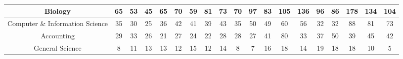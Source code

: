 \documentclass[10]{article}
\begin{document}
\begin{landscape}
\begin{longtable}[c]{|ccccccccccccccccccc|}
	\multicolumn{1}{|c|}{Biology}                                    & \multicolumn{1}{c|}{65}         & \multicolumn{1}{c|}{53}         & \multicolumn{1}{c|}{45}         & \multicolumn{1}{c|}{65}         & \multicolumn{1}{c|}{70}         & \multicolumn{1}{c|}{59}         & \multicolumn{1}{c|}{81}         & \multicolumn{1}{c|}{73}         & \multicolumn{1}{c|}{70}         & \multicolumn{1}{c|}{97}         & \multicolumn{1}{c|}{83}         & \multicolumn{1}{c|}{105}        & \multicolumn{1}{c|}{136}        & \multicolumn{1}{c|}{96}         & \multicolumn{1}{c|}{86}         & \multicolumn{1}{c|}{178}        & \multicolumn{1}{c|}{134}        & 104        \\ \hline
	\multicolumn{1}{|c|}{Computer \& Information Science}            & \multicolumn{1}{c|}{35}         & \multicolumn{1}{c|}{30}         & \multicolumn{1}{c|}{25}         & \multicolumn{1}{c|}{36}         & \multicolumn{1}{c|}{42}         & \multicolumn{1}{c|}{41}         & \multicolumn{1}{c|}{39}         & \multicolumn{1}{c|}{43}         & \multicolumn{1}{c|}{35}         & \multicolumn{1}{c|}{50}         & \multicolumn{1}{c|}{49}         & \multicolumn{1}{c|}{60}         & \multicolumn{1}{c|}{56}         & \multicolumn{1}{c|}{32}         & \multicolumn{1}{c|}{32}         & \multicolumn{1}{c|}{88}         & \multicolumn{1}{c|}{81}         & 73         \\ \hline
	\multicolumn{1}{|c|}{Accounting}                                 & \multicolumn{1}{c|}{29}         & \multicolumn{1}{c|}{33}         & \multicolumn{1}{c|}{26}         & \multicolumn{1}{c|}{21}         & \multicolumn{1}{c|}{27}         & \multicolumn{1}{c|}{24}         & \multicolumn{1}{c|}{22}         & \multicolumn{1}{c|}{28}         & \multicolumn{1}{c|}{28}         & \multicolumn{1}{c|}{27}         & \multicolumn{1}{c|}{41}         & \multicolumn{1}{c|}{80}         & \multicolumn{1}{c|}{33}         & \multicolumn{1}{c|}{37}         & \multicolumn{1}{c|}{50}         & \multicolumn{1}{c|}{39}         & \multicolumn{1}{c|}{45}         & 42         \\ \hline
	\multicolumn{1}{|c|}{General Science}                            & \multicolumn{1}{c|}{8}          & \multicolumn{1}{c|}{11}         & \multicolumn{1}{c|}{13}         & \multicolumn{1}{c|}{13}         & \multicolumn{1}{c|}{12}         & \multicolumn{1}{c|}{15}         & \multicolumn{1}{c|}{12}         & \multicolumn{1}{c|}{14}         & \multicolumn{1}{c|}{8}          & \multicolumn{1}{c|}{7}          & \multicolumn{1}{c|}{16}         & \multicolumn{1}{c|}{18}         & \multicolumn{1}{c|}{14}         & \multicolumn{1}{c|}{19}         & \multicolumn{1}{c|}{18}         & \multicolumn{1}{c|}{18}         & \multicolumn{1}{c|}{10}         & 5          \\ \hline

\end{longtable}
\end{landscape}
\end{document}
